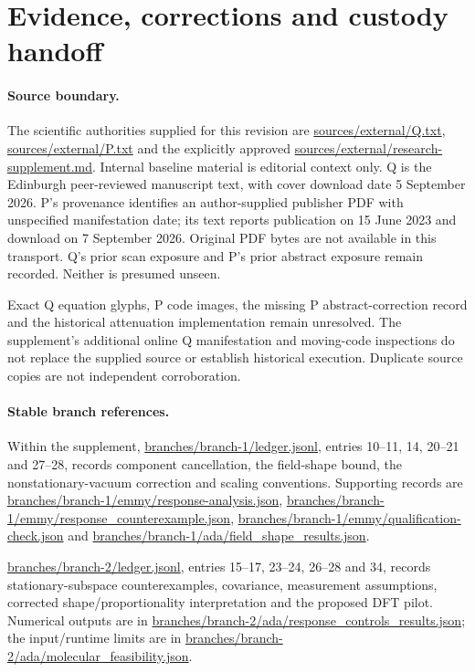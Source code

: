 \documentclass{article}
\begin{document}
\appendix
\section{Evidence, corrections and custody handoff}

\paragraph{Source boundary.}
The scientific authorities supplied for this revision are \url{sources/external/Q.txt}, \url{sources/external/P.txt} and the explicitly approved \url{sources/external/research-supplement.md}. Internal baseline material is editorial context only. Q is the Edinburgh peer-reviewed manuscript text, with cover download date 5 September 2026. P's provenance identifies an author-supplied publisher PDF with unspecified manifestation date; its text reports publication on 15 June 2023 and download on 7 September 2026. Original PDF bytes are not available in this transport. Q's prior scan exposure and P's prior abstract exposure remain recorded. Neither is presumed unseen.

Exact Q equation glyphs, P code images, the missing P abstract-correction record and the historical attenuation implementation remain unresolved. The supplement's additional online Q manifestation and moving-code inspections do not replace the supplied source or establish historical execution. Duplicate source copies are not independent corroboration.

\paragraph{Stable branch references.}
Within the supplement, \url{branches/branch-1/ledger.jsonl}, entries 10--11, 14, 20--21 and 27--28, records component cancellation, the field-shape bound, the nonstationary-vacuum correction and scaling conventions. Supporting records are \url{branches/branch-1/emmy/response-analysis.json}, \url{branches/branch-1/emmy/response_counterexample.json}, \url{branches/branch-1/emmy/qualification-check.json} and \url{branches/branch-1/ada/field_shape_results.json}.

\url{branches/branch-2/ledger.jsonl}, entries 15--17, 23--24, 26--28 and 34, records stationary-subspace counterexamples, covariance, measurement assumptions, corrected shape/proportionality interpretation and the proposed DFT pilot. Numerical outputs are in \url{branches/branch-2/ada/response_controls_results.json}; the input/runtime limits are in \url{branches/branch-2/ada/molecular_feasibility.json}.
\end{document}
